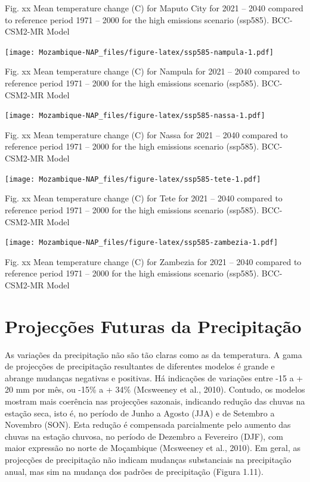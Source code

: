 \documentclass[
]{book}
\begin{document}
Fig. xx Mean temperature change (C) for Maputo City for 2021 -- 2040 compared to reference period 1971 -- 2000 for the high emissions scenario (ssp585). BCC-CSM2-MR Model

\texttt{[image: Mozambique-NAP\_files/figure-latex/ssp585-nampula-1.pdf]}

Fig. xx Mean temperature change (C) for Nampula for 2021 -- 2040 compared to reference period 1971 -- 2000 for the high emissions scenario (ssp585). BCC-CSM2-MR Model

\texttt{[image: Mozambique-NAP\_files/figure-latex/ssp585-nassa-1.pdf]}

Fig. xx Mean temperature change (C) for Nassa for 2021 -- 2040 compared to reference period 1971 -- 2000 for the high emissions scenario (ssp585). BCC-CSM2-MR Model

\texttt{[image: Mozambique-NAP\_files/figure-latex/ssp585-tete-1.pdf]}

Fig. xx Mean temperature change (C) for Tete for 2021 -- 2040 compared to reference period 1971 -- 2000 for the high emissions scenario (ssp585). BCC-CSM2-MR Model

\texttt{[image: Mozambique-NAP\_files/figure-latex/ssp585-zambezia-1.pdf]}

Fig. xx Mean temperature change (C) for Zambezia for 2021 -- 2040 compared to reference period 1971 -- 2000 for the high emissions scenario (ssp585). BCC-CSM2-MR Model

\hypertarget{projecuxe7uxf5es-futuras-da-precipitauxe7uxe3o}{%
\section{Projecções Futuras da Precipitação}\label{projecuxe7uxf5es-futuras-da-precipitauxe7uxe3o}}

As variações da precipitação não são tão claras como as da temperatura. A gama de projecções de precipitação resultantes de diferentes modelos é grande e abrange mudanças negativas e positivas. Há indicações de variações entre -15 a + 20 mm por mês, ou -15\% a + 34\% (Mcsweeney et al., 2010). Contudo, os modelos mostram mais coerência nas projecções sazonais, indicando redução das chuvas na estação seca, isto é, no período de Junho a Agosto (JJA) e de Setembro a Novembro (SON). Esta redução é compensada parcialmente pelo aumento das chuvas na estação chuvosa, no período de Dezembro a Fevereiro (DJF), com maior expressão no norte de Moçambique (Mcsweeney et al., 2010). Em geral, as projecções de precipitação não indicam mudanças substanciais na precipitação anual, mas sim na mudança dos padrões de precipitação (Figura 1.11).
\end{document}

